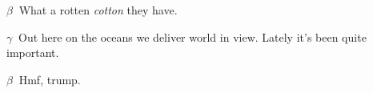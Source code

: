 

$\beta\ $ What a rotten {\it cotton} they have.

$\gamma\ $ Out here on the oceans we deliver world in view.  Lately it's been quite important.

$\beta\ $ Hmf, trump.

\bye
